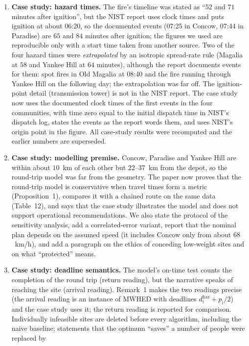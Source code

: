 \documentclass[11pt]{article}
\begin{document}
\begin{enumerate}[leftmargin=*,itemsep=3pt]
\item \textbf{Case study: hazard times.} The fire's timeline was stated as
``$52$ and $71$ minutes after ignition'', but the NIST report uses clock
times and puts ignition at about 06:20, so the documented events (07:25 in
Concow, 07:44 in Paradise) are $65$ and $84$ minutes after ignition; the
figures we used are reproducible only with a start time taken from another
source. Two of the four hazard times were \emph{extrapolated} by an
isotropic spread-rate rule (Magalia at $58$ and Yankee Hill at $64$
minutes), although the report documents events for them: spot fires in Old
Magalia at 08:40 and the fire running through Yankee Hill on the following
day; the extrapolation was far off. The ignition-point detail
(transmission tower) is not in the NIST report. The case study now uses
the documented clock times of the first events in the four communities,
with time zero equal to the initial dispatch time in NIST's dispatch log,
states the events as the report words them, and uses NIST's origin point
in the figure. All case-study results were recomputed and the earlier
numbers are superseded.
\item \textbf{Case study: modelling premise.} Concow, Paradise and Yankee
Hill are within about $10$~km of each other but $22$--$37$~km from the
depot, so the round-trip model was far from the geometry. The paper now
proves that the round-trip model is conservative when travel times form a
metric (Proposition~1), compares it with a chained route on the same data
(Table~12), and says that the case study illustrates the model and does
not support operational recommendations. We also state the protocol of the
sensitivity analysis, add a correlated-error variant, report that the
nominal plan depends on the assumed speed (it includes Concow only from
about $68$~km/h), and add a paragraph on the ethics of conceding
low-weight sites and on what ``protected'' means.
\item \textbf{Case study: deadline semantics.} The model's on-time test
counts the completion of the round trip (return reading), but the
narrative speaks of reaching the site (arrival reading). Remark~1 makes
the two readings precise (the arrival reading is an instance of MWHED with
deadlines $d_i^{\mathrm{haz}}+p_i/2$) and the case study uses it; the
return reading is reported for comparison. Individually infeasible sites
are deleted before every algorithm, including the naive baseline;
statements that the optimum ``saves'' a number of people were replaced by

\end{enumerate}
\end{document}
